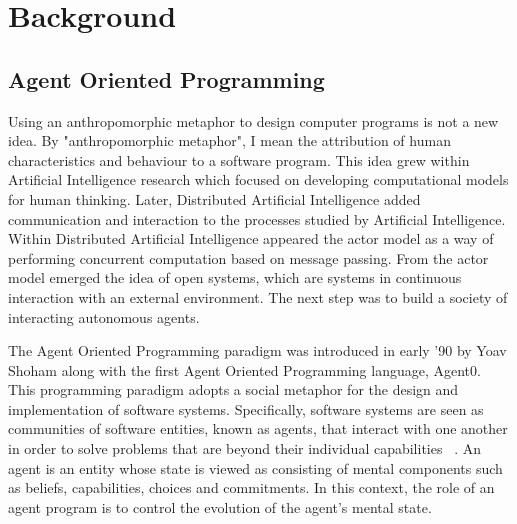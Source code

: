 \documentclass[a4paper,12pt,oneside,fleqn]{book} %
\newcommand{\rg}[1]{\marginpar{\tiny\raggedright\textcolor{blue}{\bf rg:} #1}}
\newcommand{\todo}[1]{[\textcolor{red}{TODO}: #1]}
\renewcommand{\rg}{}
\begin{document}



\part{Background}\label{ch:aop} %
\chapter{Agent Oriented Programming} %

Using an anthropomorphic metaphor to design computer programs is not a new
idea. By "anthropomorphic metaphor", I mean the attribution of human
characteristics and behaviour to a software program. This idea grew within
Artificial Intelligence research which focused on developing computational
models for human thinking. Later, Distributed Artificial Intelligence added
communication and interaction to the processes studied by Artificial
Intelligence.  Within Distributed Artificial Intelligence appeared the
actor model as a way of performing concurrent computation based on message
passing. From the actor model emerged the idea of open systems, which are
systems in continuous interaction with an external environment. The next step
was to build a society of interacting autonomous agents.

The Agent Oriented Programming paradigm was introduced in early '90 by Yoav
Shoham along with the first Agent Oriented Programming language, Agent0.
This programming paradigm adopts a social metaphor for the design and
implementation of software systems. Specifically, software systems are seen
as communities of software entities, known as agents, that interact with
one another in order to solve problems that are beyond their individual
capabilities ~\cite{DBLP:journals/ai/Shoham93}. An agent is an entity whose
state is viewed as consisting of mental components such as beliefs,
capabilities, choices and commitments. In this context, the role of an
agent program is to control the evolution of the agent's mental state.
\end{document}
